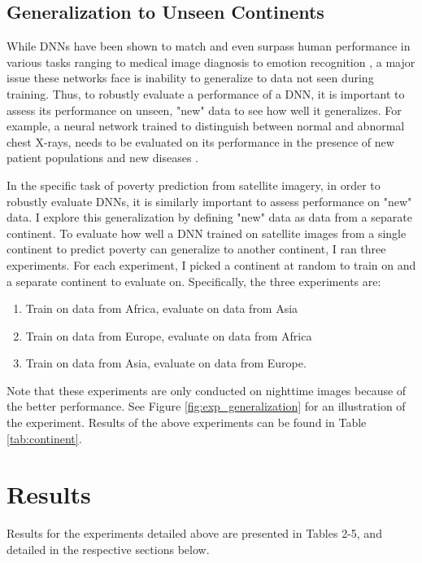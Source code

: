 \documentclass{article}
\begin{document}
\subsection{Generalization to Unseen Continents}

While DNNs have been shown to match and even surpass human performance in various tasks ranging to medical image diagnosis \cite{cxr} to emotion recognition \cite{emotion}, a major issue these networks face is inability to generalize to data not seen during training. Thus, to robustly evaluate a performance of a DNN, it is important to assess its performance on unseen, "new" data to see how well it generalizes. For example, a neural network trained to distinguish between normal and abnormal chest X-rays, needs to be evaluated on its performance in the presence of new patient populations and new diseases \cite{Nabulsi}.

In the specific task of poverty prediction from satellite imagery, in order to robustly evaluate DNNs, it is similarly important to assess performance on "new" data. I explore this generalization by defining "new" data as data from a separate continent. To evaluate how well a DNN trained on satellite images from a single continent to predict poverty can generalize to another continent, I ran three experiments. For each experiment, I picked a continent at random to train on and a separate continent to evaluate on. Specifically, the three experiments are:

\begin{enumerate}

    \item Train on data from Africa, evaluate on data from Asia
    \item Train on data from Europe, evaluate on data from Africa
    \item Train on data from Asia, evaluate on data from Europe.

\end{enumerate}

Note that these experiments are only conducted on nighttime images because of the better performance. See Figure \ref{fig:exp_generalization} for an illustration of the experiment. Results of the above experiments can be found in Table \ref{tab:continent}.

\section{Results}
Results for the experiments detailed above are presented in Tables 2-5, and detailed in the respective sections below.
\end{document}

